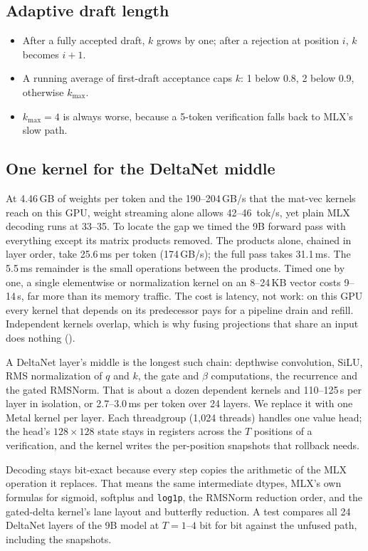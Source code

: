 \documentclass[11pt]{article}
\begin{document}
\subsection{Adaptive draft length}
\begin{itemize}
\item After a fully accepted draft, $k$ grows by one; after a rejection at position $i$, $k$ becomes $i{+}1$.
\item A running average of first-draft acceptance caps $k$: 1 below 0.8, 2 below 0.9, otherwise $k_{\max}$.
\item $k_{\max}{=}4$ is always worse, because a 5-token verification falls back to MLX's slow path.
\end{itemize}

\subsection{One kernel for the DeltaNet middle}
\label{sec:fused}
At 4.46\,GB of weights per token and the 190--204\,GB/s that the mat-vec kernels reach on this GPU, weight streaming alone allows 42--46~tok/s, yet plain MLX decoding runs at 33--35. To locate the gap we timed the 9B forward pass with everything except its matrix products removed. The products alone, chained in layer order, take 25.6\,ms per token (174\,GB/s); the full pass takes 31.1\,ms. The 5.5\,ms remainder is the small operations between the products. Timed one by one, a single elementwise or normalization kernel on an 8--24\,KB vector costs 9--14\,\textmu s, far more than its memory traffic. The cost is latency, not work: on this GPU every kernel that depends on its predecessor pays for a pipeline drain and refill. Independent kernels overlap, which is why fusing projections that share an input does nothing ().

A DeltaNet layer's middle is the longest such chain: depthwise convolution, SiLU, RMS normalization of $q$ and $k$, the gate and $\beta$ computations, the recurrence and the gated RMSNorm. That is about a dozen dependent kernels and 110--125\,\textmu s per layer in isolation, or 2.7--3.0\,ms per token over 24 layers. We replace it with one Metal kernel per layer. Each threadgroup (1{,}024 threads) handles one value head; the head's $128{\times}128$ state stays in registers across the $T$ positions of a verification, and the kernel writes the per-position snapshots that rollback needs.

Decoding stays bit-exact because every step copies the arithmetic of the MLX operation it replaces. That means the same intermediate dtypes, MLX's own formulas for sigmoid, softplus and \texttt{log1p}, the RMSNorm reduction order, and the gated-delta kernel's lane layout and butterfly reduction. A test compares all 24 DeltaNet layers of the 9B model at $T{=}1$--$4$ bit for bit against the unfused path, including the snapshots.
\end{document}
